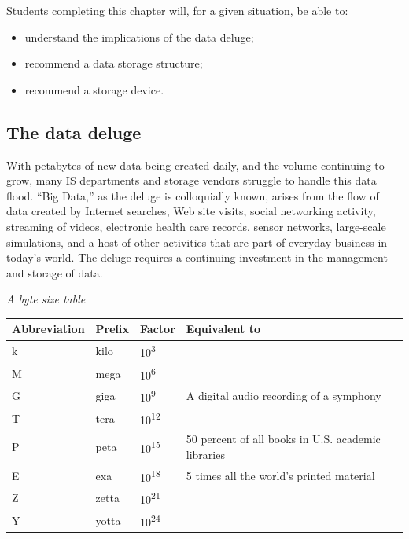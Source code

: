 \documentclass[
]{article}
\begin{document}
Students completing this chapter will, for a given situation, be able
to:

\begin{itemize}
\item
  understand the implications of the data deluge;
\item
  recommend a data storage structure;
\item
  recommend a storage device.
\end{itemize}

\hypertarget{the-data-deluge}{%
\subsection*{The data deluge}\label{the-data-deluge}}

With petabytes of new data being created daily, and the volume
continuing to grow, many IS departments and storage vendors struggle to
handle this data flood. ``Big Data,'' as the deluge is colloquially known,
arises from the flow of data created by Internet searches, Web site
visits, social networking activity, streaming of videos, electronic
health care records, sensor networks, large-scale simulations, and a
host of other activities that are part of everyday business in today's
world. The deluge requires a continuing investment in the management and
storage of data.

\emph{A byte size table}

\begin{longtable}[]{@{}llll@{}}
\toprule
Abbreviation & Prefix & Factor & Equivalent to \\
\midrule
\endhead
k & kilo & 10\textsuperscript{3} & \\
M & mega & 10\textsuperscript{6} & \\
G & giga & 10\textsuperscript{9} & A digital audio recording of a symphony \\
T & tera & 10\textsuperscript{12} & \\
P & peta & 10\textsuperscript{15} & 50 percent of all books in U.S. academic libraries \\
E & exa & 10\textsuperscript{18} & 5 times all the world's printed material \\
Z & zetta & 10\textsuperscript{21} & \\
Y & yotta & 10\textsuperscript{24} & \\
\bottomrule
\end{longtable}
\end{document}
